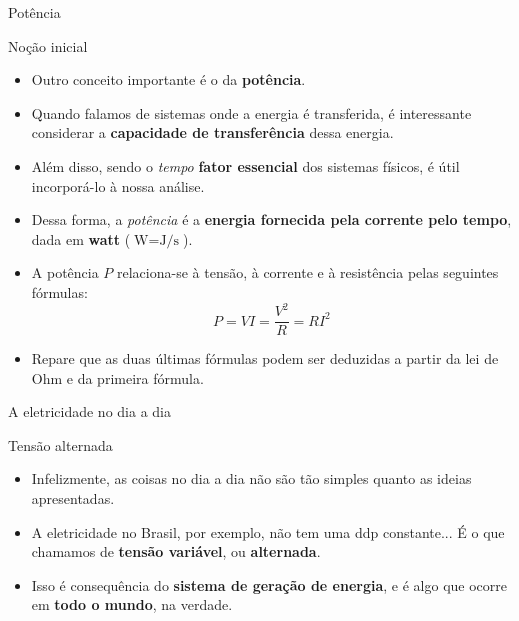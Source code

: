 \begin{frame}{Potência}
	\begin{block}{Noção inicial}
		\begin{itemize}
			\item Outro conceito importante é o da \textbf{potência}.
			\item Quando falamos de sistemas onde a energia é transferida, é interessante considerar a \textbf{capacidade de transferência} dessa energia.
			\item Além disso, sendo o \textit{tempo} \textbf{fator essencial} dos sistemas físicos, é útil incorporá-lo à nossa análise.
			\item Dessa forma, a \textit{potência} é a \textbf{energia fornecida pela corrente pelo tempo}, dada em \textbf{watt} ($ \si{\watt}=\si{\joule\per\second} $).
			\item A potência $ P $ relaciona-se à tensão, à corrente e à resistência pelas seguintes fórmulas:
			      \[ P=VI=\dfrac{V^{2}}{R}=RI^{2} \]
			\item Repare que as duas últimas fórmulas podem ser deduzidas a partir da lei de Ohm e da primeira fórmula.
		\end{itemize}

	\end{block}
\end{frame}


\begin{frame}{A eletricidade no dia a dia}
	\begin{block}{Tensão alternada}
		\begin{itemize}
			\item Infelizmente, as coisas no dia a dia não são tão simples quanto as ideias apresentadas.
			\item A eletricidade no Brasil, por exemplo, não tem uma ddp constante... É o que chamamos de \textbf{tensão variável}, ou \textbf{alternada}.
			\item Isso é consequência do \textbf{sistema de geração de energia}, e é algo que ocorre em \textbf{todo o mundo}, na verdade.
		\end{itemize}
	\end{block}
\end{frame}


